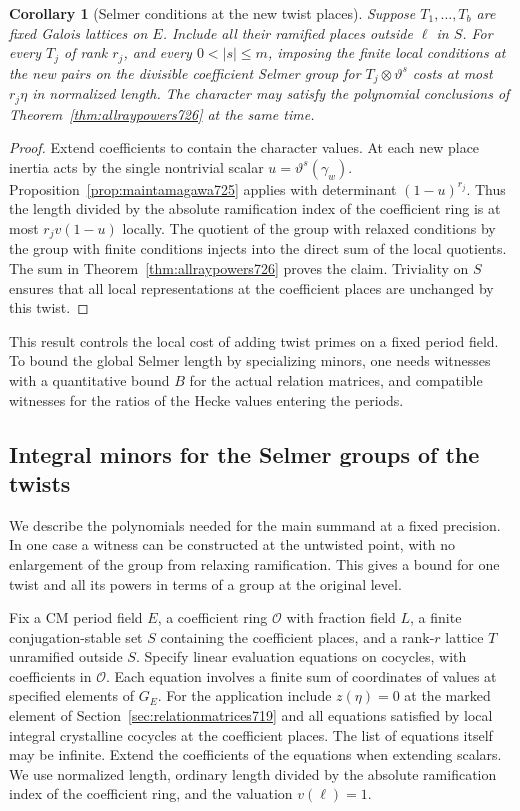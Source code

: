 \documentclass[a4paper,11pt]{article}
\newtheorem{corollary}[proposition]{Corollary}
\theoremstyle{definition}
\theoremstyle{remark}
\numberwithin{equation}{section}
\begin{document}
\begin{corollary}[Selmer conditions at the new twist places]\leavevmode
\label{cor:raytamagawa726}
Suppose \(T_1,\ldots,T_b\) are fixed Galois lattices on \(E\).
Include all their ramified places outside \(\ell\) in \(S\).
For every \(T_j\) of rank \(r_j\), and every \(0<|s|\le m\), imposing
the finite local conditions at the new pairs on the divisible
coefficient Selmer group for \(T_j\otimes\vartheta^s\) costs at most
\(r_j\eta\) in normalized length. The character may satisfy the
polynomial conclusions of Theorem~\ref{thm:allraypowers726} at the same
time.
\end{corollary}
\begin{proof}
Extend coefficients to contain the character values. At each new place
inertia acts by the single nontrivial scalar
\(u=\vartheta^s(\gamma_w)\). Proposition~\ref{prop:maintamagawa725}
applies with determinant \((1-u)^{r_j}\). Thus the length divided by the
absolute ramification index of the coefficient ring is at most
\(r_j v(1-u)\) locally. The quotient of the group with relaxed conditions
by the group with finite conditions injects into the direct sum of the
local quotients. The sum in Theorem~\ref{thm:allraypowers726} proves the
claim. Triviality on \(S\) ensures that all local representations at
the coefficient places are unchanged by this twist.
\end{proof}

This result controls the local cost of adding twist primes on a fixed
period field. To bound the global Selmer length by specializing minors,
one needs witnesses with a quantitative bound \(B\) for the actual
relation matrices, and compatible witnesses for the ratios of the
Hecke values entering the periods.
\clearpage

\subsection{Integral minors for the Selmer groups of the twists}
\label{sec:selmerpolys727}

We describe the polynomials needed for the main summand at a fixed
precision. In one case a witness can be constructed at the untwisted
point, with no enlargement of the group from relaxing ramification.
This gives a bound for one twist and all its powers in terms of a
group at the original level.

Fix a CM period field \(E\), a coefficient ring \(\mathcal O\) with
fraction field \(L\), a finite conjugation-stable set \(S\) containing
the coefficient places, and a rank-\(r\) lattice \(T\) unramified
outside \(S\). Specify linear evaluation equations on cocycles, with
coefficients in \(\mathcal O\). Each equation involves a finite sum
of coordinates of values at specified elements of \(G_E\). For the
application include \(z(\eta)=0\) at the marked element of
Section~\ref{sec:relationmatrices719} and all equations satisfied by
local integral crystalline cocycles at the coefficient places.
The list of equations itself may be infinite. Extend the coefficients
of the equations when extending scalars. We use normalized length,
ordinary length divided by the absolute ramification index of the
coefficient ring, and the valuation \(v(\ell)=1\).
\end{document}
